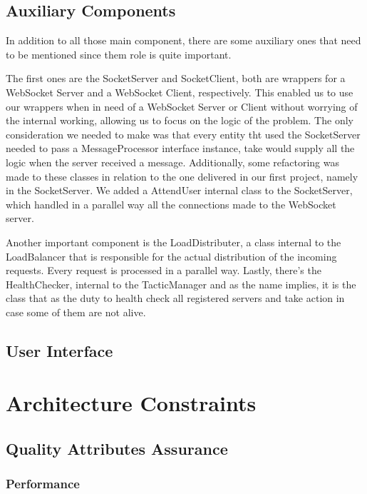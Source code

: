 \documentclass[12pt]{article}
\begin{document}
\subsection{Auxiliary Components}
In addition to all those  main component, there are some auxiliary ones that need to be mentioned since them role is quite important.

The first ones are the SocketServer and SocketClient, both are wrappers for a WebSocket Server and a WebSocket Client, respectively. This enabled us to use our wrappers when in need of a WebSocket Server or Client without worrying of the internal working, allowing us to focus on the logic of the problem. The only consideration we needed to make was that every entity tht used the SocketServer needed to pass a MessageProcessor interface instance, take would supply all the logic when the server received a message. Additionally, some refactoring was made to these classes in relation to the one delivered in our first project, namely in the SocketServer. We added a AttendUser internal class to the SocketServer, which handled in a parallel way all the connections made to the WebSocket server.

Another important component is the LoadDistributer, a class internal to the LoadBalancer that is responsible for the actual distribution of the incoming requests. Every request is processed in a parallel way. Lastly, there's the HealthChecker, internal to the TacticManager and as the name implies, it is the class that as the duty to health check all registered servers and take action in case some of them are not alive.

\subsection{User Interface} \label{ui} %


\newpage
\section{Architecture Constraints} \label{constraints} %


\subsection{Quality Attributes Assurance} \label{qaa} %

\subsubsection{Performance}
\end{document}
